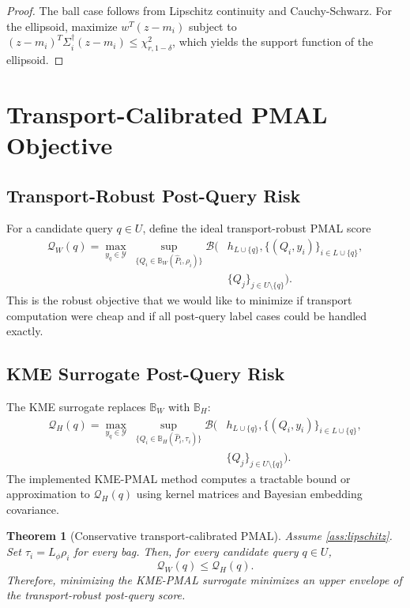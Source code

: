 \documentclass[10pt,journal]{IEEEtran}
\newtheorem{theorem}{Theorem}
\newcommand{\Ycal}{\mathcal{Y}}
\newcommand{\wh}{\widehat}
\newcommand{\ball}{\mathbb{B}}
\begin{document}
\begin{proof}
The ball case follows from Lipschitz continuity and Cauchy-Schwarz. For the ellipsoid, maximize $w^T(z-m_i)$ subject to $(z-m_i)^T\Sigma_i^\dagger(z-m_i)\le \chi^2_{r,1-\delta}$, which yields the support function of the ellipsoid.
\end{proof}

\section{Transport-Calibrated PMAL Objective}
\label{sec:objective}

\subsection{Transport-Robust Post-Query Risk}

For a candidate query $q\in U$, define the ideal transport-robust PMAL score
\begin{equation}
\label{eq:w-score}
\begin{aligned}
\mathcal{Q}_W(q)=
\max_{y_q\in\Ycal}\;
\sup_{\{Q_i\in\ball_W(\wh P_i,\rho_i)\}}
\mathcal{B}\big(&h_{L\cup\{q\}},
\{(Q_i,y_i)\}_{i\in L\cup\{q\}},\\
&\{Q_j\}_{j\in U\setminus\{q\}}\big).
\end{aligned}
\end{equation}
This is the robust objective that we would like to minimize if transport computation were cheap and if all post-query label cases could be handled exactly.

\subsection{KME Surrogate Post-Query Risk}

The KME surrogate replaces $\ball_W$ with $\ball_H$:
\begin{equation}
\label{eq:h-score}
\begin{aligned}
\mathcal{Q}_H(q)=
\max_{y_q\in\Ycal}\;
\sup_{\{Q_i\in\ball_H(\wh P_i,\tau_i)\}}
\mathcal{B}\big(&h_{L\cup\{q\}},
\{(Q_i,y_i)\}_{i\in L\cup\{q\}},\\
&\{Q_j\}_{j\in U\setminus\{q\}}\big).
\end{aligned}
\end{equation}
The implemented KME-PMAL method computes a tractable bound or approximation to $\mathcal{Q}_H(q)$ using kernel matrices and Bayesian embedding covariance.

\begin{theorem}[Conservative transport-calibrated PMAL]
\label{thm:conservative}
Assume \cref{ass:lipschitz}. Set $\tau_i=L_\phi\rho_i$ for every bag. Then, for every candidate query $q\in U$,
\begin{equation}
    \mathcal{Q}_W(q)\le \mathcal{Q}_H(q).
\end{equation}
Therefore, minimizing the KME-PMAL surrogate minimizes an upper envelope of the transport-robust post-query score.
\end{theorem}
\end{document}
